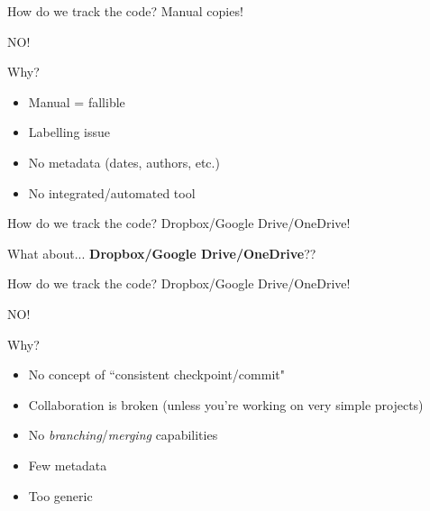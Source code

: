 \begin{frame}[fragile]{How do we track the code? Manual copies!}

\begin{center}
\Huge NO!
\end{center}

Why?
\begin{itemize}
  \item Manual = fallible
  \item Labelling issue
  \item No metadata (dates, authors, etc.)
  \item No integrated/automated tool
\end{itemize}

\end{frame}

\begin{frame}[fragile]{How do we track the code? Dropbox/Google Drive/OneDrive!}

What about... \textbf{Dropbox/Google Drive/OneDrive}??

\end{frame}

\begin{frame}[fragile]{How do we track the code? Dropbox/Google Drive/OneDrive!}

\begin{center}
\Huge NO!
\end{center}

\normalsize
Why?
\begin{itemize}
  \item No concept of ``consistent checkpoint/commit"
  \item Collaboration is broken (unless you're working on very simple projects)
  \item No \textit{branching}/\textit{merging} capabilities
  \item Few metadata
  \item Too generic
\end{itemize}

\end{frame}

